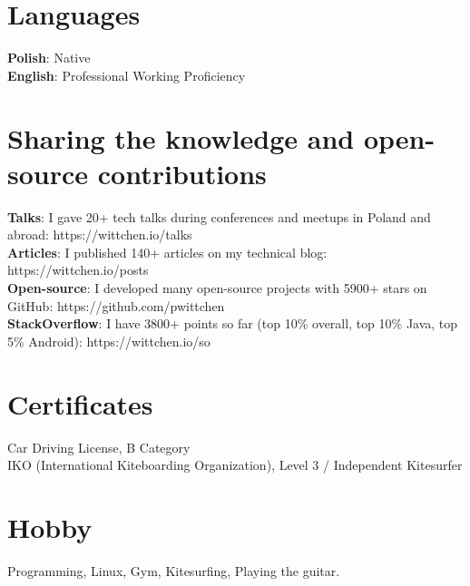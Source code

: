 \documentclass[letterpaper,11pt]{article}
\begin{document}
\section{Languages}
 \begin{itemize}[leftmargin=0.15in, label={}]
    \small{\item{
     \textbf{Polish}{: Native} \\
     \textbf{English}{: Professional Working Proficiency} \\
    }}
 \end{itemize}

\section{Sharing the knowledge and open-source contributions}
 \begin{itemize}[leftmargin=0.15in, label={}]
    \small{\item{
     \textbf{Talks}{: I gave 20+ tech talks during conferences and meetups in Poland and abroad: https://wittchen.io/talks} \\
     \textbf{Articles}{: I published 140+ articles on my technical blog: https://wittchen.io/posts} \\
     \textbf{Open-source}{: I developed many open-source projects with 5900+ stars on GitHub: https://github.com/pwittchen} \\
     \textbf{StackOverflow}{: I have 3800+ points so far (top 10\% overall, top 10\% Java, top 5\% Android): https://wittchen.io/so}
    }}
 \end{itemize}

\section{Certificates}
 \begin{itemize}[leftmargin=0.15in, label={}]
    \small{\item{
    {Car Driving License, B Category} \\
    {IKO (International Kiteboarding Organization), Level 3 / Independent Kitesurfer}\\
    }}
 \end{itemize}

\section{Hobby}
 \begin{itemize}[leftmargin=0.15in, label={}]
    \small{\item{
     Programming, Linux, Gym, Kitesurfing, Playing the guitar.\\
    }}
 \end{itemize}
\end{document}
